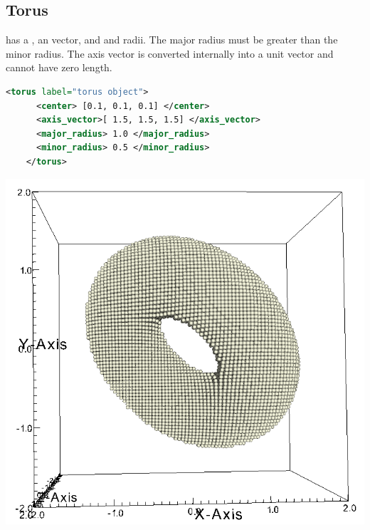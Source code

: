 \subsection{Torus}
\begin{minipage}{0.6\textwidth}
   has a , an  vector,
  and  and  radii.   The major radius must
  be greater than the minor radius.  The axis vector is converted
  internally into a unit vector and cannot have zero length.
  \begin{lstlisting}[language=XML]
    <torus label="torus object">
      <center> [0.1, 0.1, 0.1] </center>
      <axis_vector>[ 1.5, 1.5, 1.5] </axis_vector>
      <major_radius> 1.0 </major_radius>
      <minor_radius> 0.5 </minor_radius>
    </torus>
  \end{lstlisting}
\end{minipage}
\begin{minipage}{0.4\textwidth}
  \centering
  \includegraphics[width=0.6\columnwidth]{FIGS/geometry/geom_torus.png}
\end{minipage}

